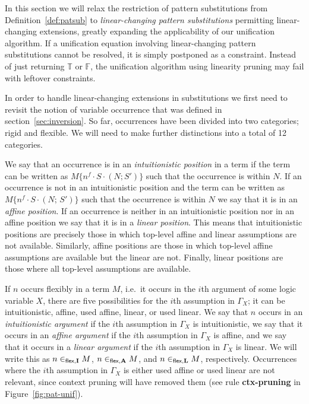 \documentclass{eptcs}
\newcommand\affext{\mathring{;}\,}
\newcommand\fI{\textup{$\mathbf{I}$}}
\newcommand\fA{\textup{$\mathbf{A}$}}
\newcommand\fL{\textup{$\mathbf{L}$}}
\theoremstyle{definition}
\begin{document}
In this section we will relax the restriction of pattern substitutions
from Definition~\ref{def:patsub} to \emph{linear-changing pattern substitutions}
permitting linear-changing extensions, greatly
expanding the applicability of our unification algorithm. If a
unification equation involving linear-changing pattern
substitutions cannot be resolved, it is simply postponed as a
constraint.  Instead of just returning $\mathbb{T}$ or $\mathbb{F}$,
the unification algorithm using linearity pruning may fail with 
leftover constraints.



In order to handle linear-changing extensions in substitutions we
first need to revisit the notion of variable occurrence that was defined in
section~\ref{sec:inversion}.  So far, occurrences have been
divided into two categories; rigid and flexible.  We will need to make
further distinctions into a total of 12 categories.

We say that an occurrence is in an \emph{intuitionistic position}
in a term if the term can be written as $M\{n^f\cdot S\cdot (N;S')\}$ such
that the occurrence is within $N$.  If an occurrence is not in an
intuitionistic position and the term can be written as
$M\{n^f\cdot S\cdot (N\affext S')\}$ such that the occurrence is within
$N$ we say that it is in an \emph{affine position}.
If an occurrence is neither in an intuitionistic position nor in an
affine position we say that it is in a \emph{linear position}.
This means that intuitionistic positions are precisely those
in which top-level affine and linear assumptions are
not available. Similarly,  affine positions are those in which top-level affine
assumptions are available but the linear are not.  Finally,  linear
positions are those where all top-level assumptions are available.

If  $n$ occurs flexibly in a term $M$, i.e.\ it occurs in the $i$th
argument of some logic variable $X$, there are five possibilities for
the $i$th assumption in $\Gamma_X$; it can be intuitionistic, affine,
used affine, linear, or used linear.  We say that $n$ occurs in an
\emph{intuitionistic argument} if the $i$th assumption in $\Gamma_X$ is
intuitionistic, we say that it occurs in an \emph{affine argument} if
the $i$th assumption in $\Gamma_X$ is affine, and we say that it occurs
in a \emph{linear argument} if the $i$th assumption in $\Gamma_X$ is
linear.  We will write this as $n\in_{\textsf{flex},\fI}M$,
$n\in_{\textsf{flex},\fA}M$, and $n\in_{\textsf{flex},\fL}M$, respectively.
Occurrences where the $i$th assumption in $\Gamma_X$ is either
used affine or used linear are not relevant, since context pruning
will have removed them
(see rule \textbf{ctx-pruning} in Figure~\ref{fig:pat-unif}).
\end{document}
